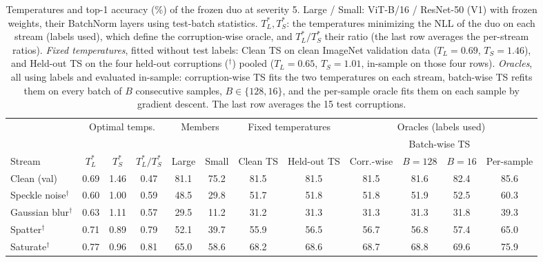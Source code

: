 \begin{table}[t]
    \centering
    \small
    \setlength{\tabcolsep}{4.5pt}
    \caption{Temperatures and top-1 accuracy (\%) of the frozen duo at severity 5. Large / Small: ViT-B/16 / ResNet-50 (V1) with frozen weights, their BatchNorm layers using test-batch statistics. $T_L^*, T_S^*$: the temperatures minimizing the NLL of the duo on each stream (labels used), which define the corruption-wise oracle, and $T_L^*/T_S^*$ their ratio (the last row averages the per-stream ratios). \emph{Fixed temperatures}, fitted without test labels: Clean TS on clean ImageNet validation data ($T_L = 0.69$, $T_S = 1.46$), and Held-out TS on the four held-out corruptions ($^\dagger$) pooled ($T_L = 0.65$, $T_S = 1.01$, in-sample on those four rows). \emph{Oracles}, all using labels and evaluated in-sample: corruption-wise TS fits the two temperatures on each stream, batch-wise TS refits them on every batch of $B$ consecutive samples, $B \in \{128, 16\}$, and the per-sample oracle fits them on each sample by gradient descent. The last row averages the 15 test corruptions.}
    \label{tab:temperatures:frozen_bn}
    \label{tab:oracles:frozen_bn}
    \begin{tabular}{l|ccc|cc|cc|cccc}
        \toprule
        & \multicolumn{3}{c|}{Optimal temps.} & \multicolumn{2}{c|}{Members} & \multicolumn{2}{c|}{Fixed temperatures} & \multicolumn{4}{c}{Oracles (labels used)} \\
         &  &  &  &  &  &  &  &  & \multicolumn{2}{c}{Batch-wise TS} &  \\
        \cmidrule(lr){10-11}
        Stream & $T_L^*$ & $T_S^*$ & $T_L^*/T_S^*$ & Large & Small & Clean TS & Held-out TS & Corr.-wise & $B{=}128$ & $B{=}16$ & Per-sample \\
        \midrule
        Clean (val) & 0.69 & 1.46 & 0.47 & 81.1 & 75.2 & 81.5 & 81.5 & 81.5 & 81.6 & 82.4 & 85.6 \\
        \midrule
        Speckle noise$^\dagger$ & 0.60 & 1.00 & 0.59 & 48.5 & 29.8 & 51.7 & 51.8 & 51.8 & 51.9 & 52.5 & 60.3 \\
        Gaussian blur$^\dagger$ & 0.63 & 1.11 & 0.57 & 29.5 & 11.2 & 31.2 & 31.3 & 31.3 & 31.3 & 31.8 & 39.3 \\
        Spatter$^\dagger$ & 0.71 & 0.89 & 0.79 & 52.1 & 39.7 & 55.9 & 56.5 & 56.7 & 56.8 & 57.4 & 65.0 \\
        Saturate$^\dagger$ & 0.77 & 0.96 & 0.81 & 65.0 & 58.6 & 68.2 & 68.6 & 68.7 & 68.8 & 69.6 & 75.9 \\

\end{tabular}
\end{table}
